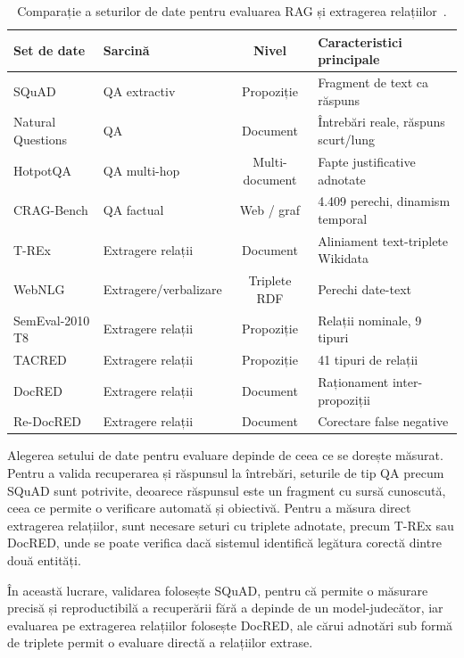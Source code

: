 \begin{table}[htbp]
\centering
\small
\begin{tabularx}{\textwidth}{l l c X}
\toprule
\textbf{Set de date} & \textbf{Sarcină} & \textbf{Nivel} & \textbf{Caracteristici principale} \\
\midrule
SQuAD & QA extractiv & Propoziție & Fragment de text ca răspuns \\
Natural Questions & QA & Document & Întrebări reale, răspuns scurt/lung \\
HotpotQA & QA multi-hop & Multi-document & Fapte justificative adnotate \\
CRAG-Bench & QA factual & Web / graf & 4.409 perechi, dinamism temporal \\
T-REx & Extragere relații & Document & Aliniament text-triplete Wikidata \\
WebNLG & Extragere/verbalizare & Triplete RDF & Perechi date-text \\
SemEval-2010 T8 & Extragere relații & Propoziție & Relații nominale, 9 tipuri \\
TACRED & Extragere relații & Propoziție & 41 tipuri de relații \\
DocRED & Extragere relații & Document & Raționament inter-propoziții \\
Re-DocRED & Extragere relații & Document & Corectare false negative \\
\bottomrule
\end{tabularx}
\caption{Comparație a seturilor de date pentru evaluarea RAG și extragerea relațiilor~\cite{rajpurkar-etal-2016-squad, kwiatkowski2019nq, yang2018hotpotqa, yang2024cragbench, elsahar2018trex, gardent2017webnlg, hendrickx2010semeval, zhang2017tacred, yao2019docred, tan2022redocred}.}
\label{tab:datasets}
\end{table}

Alegerea setului de date pentru evaluare depinde de ceea ce se dorește măsurat. Pentru a valida recuperarea și răspunsul la întrebări, seturile de tip QA precum SQuAD sunt potrivite, deoarece răspunsul este un fragment cu sursă cunoscută, ceea ce permite o verificare automată și obiectivă. Pentru a măsura direct extragerea relațiilor, sunt necesare seturi cu triplete adnotate, precum T-REx sau DocRED, unde se poate verifica dacă sistemul identifică legătura corectă dintre două entități.

În această lucrare, validarea folosește SQuAD, pentru că permite o măsurare precisă și reproductibilă a recuperării fără a depinde de un model-judecător, iar evaluarea pe extragerea relațiilor folosește DocRED, ale cărui adnotări sub formă de triplete permit o evaluare directă a relațiilor extrase.

